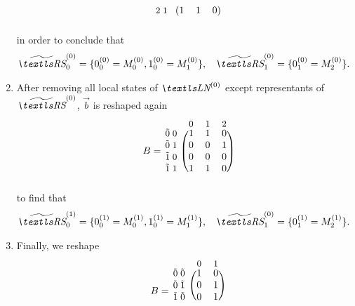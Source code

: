 \begin{runningExample}
\begin{enumerate}
\begin{equation}
\begin{blockarray}{r*{2}{@{\mkern5mu}>{$\bgroup\small$}c<{$\egroup$}}*{3}{>{$\bgroup\small$}c<{$\egroup$}}}
\begin{block}{r*{2}{@{\mkern5mu}>{$\bgroup\small$}c<{$\egroup$}}(*{3}{c})}
          & 2 & 1 & 1 & 1 & 0 \\
      \end{blockarray}
    \end{equation}
    in order to conclude that
    \begin{align}
      \loc{\Macro{\RS}}{0}_0
      &= \{ \loc{0}{0}_0 = \loc{M}{0}_0, \loc{1}{0}_0 = \loc{M}{0}_1 \},
      &\loc{\Macro{\RS}}{0}_1
      &= \{ \loc{0}{0}_1 = \loc{M}{0}_2 \}.
    \end{align}
  \item After removing all local states of $\LN{0}$ except
    representants of $\loc{\Macro{\RS}}{0}$, $\vec{b}$ is reshaped
    again
    \begin{equation}
      \begin{blockarray}{r*{2}{@{\mkern5mu}>{$\bgroup\small$}c<{$\egroup$}}*{3}{>{$\bgroup\small$}c<{$\egroup$}}}
        & & & 0 & 1 & 2 \\[-0.5ex]
        \begin{block}{r*{2}{@{\mkern5mu}>{$\bgroup\small$}c<{$\egroup$}}(*{3}{c})}
          \multirow{4}{*}{$B =\,$} & \macro{0} & 0 & 1 & 1 & 0 \\
          & \macro{0} & 1 & 0 & 0 & 1 \\
          & \macro{1} & 0 & 0 & 0 & 0 \\
          & \macro{1} & 1 & 1 & 1 & 0 \\
      \end{blockarray}
    \end{equation}
    to find that
    \begin{align}
      \loc{\Macro{\RS}}{1}_0
      &= \{ \loc{0}{1}_0 = \loc{M}{1}_0, \loc{1}{1}_0 = \loc{M}{1}_1 \},
      &\loc{\Macro{\RS}}{0}_1
      &= \{ \loc{0}{1}_1 = \loc{M}{1}_2 \}.
    \end{align}
  \item Finally, we reshape
    \begin{equation}
      \begin{blockarray}{r*{2}{@{\mkern5mu}>{$\bgroup\small$}c<{$\egroup$}}*{2}{>{$\bgroup\small$}c<{$\egroup$}}}
        & & & 0 & 1\\[-0.5ex]
        \begin{block}{r*{2}{@{\mkern5mu}>{$\bgroup\small$}c<{$\egroup$}}(*{2}{c})}
          \multirow{4}{*}{$B =\,$} & \macro{0} & \macro{0} & 1 & 0 \\
          & \macro{0} & \macro{1} & 0 & 1 \\
          & \macro{1} & \macro{0} & 0 & 1 \\

\end{block}
\end{blockarray}
\end{equation}
\end{enumerate}
\end{runningExample}
